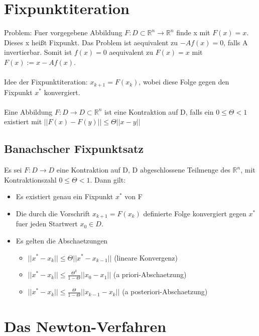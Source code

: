 \documentclass[a4paper]{scrreprt}
\begin{document}
\section{Fixpunktiteration}

Problem: Fuer vorgegebene Abbildung $F: D \subset \mathbb{R}^n \rightarrow \mathbb{R}^n$ finde x mit $F(x) = x$. Dieses x heißt Fixpunkt. Das Problem ist aequivalent zu $-Af(x) = 0$, falls A invertierbar. Somit ist $f(x) = 0$ aequivalent zu $F(x) = x$ mit $F(x) := x - Af(x)$.\\\\

Idee der Fixpunktiteration: $x_{k+1} = F(x_k)$, wobei diese Folge gegen den Fixpunkt $x^*$ konvergiert.\\\\

Eine Abbildung $F: D \rightarrow D \subset \mathbb{R}^n$ ist eine Kontraktion auf D, falls ein $0 \leq \Theta < 1$ existiert mit $||F(x) - F(y)|| \leq \Theta ||x-y||$

\subsection{Banachscher Fixpunktsatz}
Es sei $F: D \rightarrow D$ eine Kontraktion auf D, D abgeschlossene Teilmenge des $\mathbb{R}^n$, mit Kontraktionszahl $0 \leq \Theta < 1$. Dann gilt:
\begin{itemize}
	\item Es existiert genau ein Fixpunkt $x^*$ von F
	\item Die durch die Vorschrift $x_{k+1} = F(x_k)$ definierte Folge konvergiert gegen $x^*$ fuer jeden Startwert $x_0 \in D$.
	\item Es gelten die Abschaetzungen
		\begin{itemize}
			\item $||x^* - x_k|| \leq \Theta ||x^* - x_{k-1}||$ (lineare Konvergenz)
			\item $||x^* - x_k|| \leq \frac{\Theta^k}{1 - \Theta} ||x_0 - x_1||$ (a priori-Abschaetzung)
			\item $||x^* - x_k|| \leq \frac{\Theta}{1 - \Theta} ||x_{k-1} - x_k||$ (a posteriori-Abschaetzung)
		\end{itemize}
\end{itemize}

\section{Das Newton-Verfahren}
\end{document}
